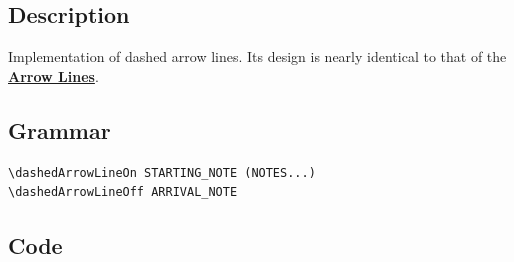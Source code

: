 \subsection{Description}
Implementation of dashed arrow lines. Its design is nearly identical to that of the \hyperref[sec:arrow_lines]{\textbf{Arrow Lines}}.
\subsection{Grammar}
\begin{verbatim}
\dashedArrowLineOn STARTING_NOTE (NOTES...)
\dashedArrowLineOff ARRIVAL_NOTE
\end{verbatim}

\subsection{Code}
